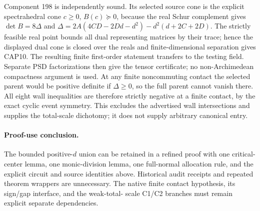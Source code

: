 Component 198 is independently sound.  Its selected source
cone is the explicit spectrahedral cone
$c\geq0$, $B(c)\succeq0$, because the real Schur complement
gives $\det B=8\Delta$ and
$\Delta=2A(4CD-2Dd-d^2)-d^2(d+2C+2D)$.
The strictly feasible real point bounds all dual representing
matrices by their trace; hence the displayed dual cone is
closed over the reals and finite-dimensional separation gives
CAP10.  The resulting finite first-order statement transfers
to the testing field.  Separate PSD factorizations then give
the tensor certificate; no non-Archimedean compactness argument
is used.  At any finite noncommuting contact the selected
parent would be positive definite if $\Delta\geq0$, so the
full parent cannot vanish there.  All eight wall inequalities
are therefore strictly negative at a finite contact, by the
exact cyclic event symmetry.  This excludes the advertised
wall intersections and supplies the total-scale dichotomy;
it does not supply arbitrary canonical entry.

\paragraph{Proof-use conclusion.}
The bounded positive-$d$ union can be retained in a refined
proof with one critical-center lemma, one monic-division lemma,
one full-normal allocation rule, and the explicit circuit and
source identities above.  Historical audit receipts and
repeated theorem wrappers are unnecessary.  The native finite
contact hypothesis, its sign/gap interface, and the weak-total-
scale C1/C2 branches must remain explicit separate dependencies.
